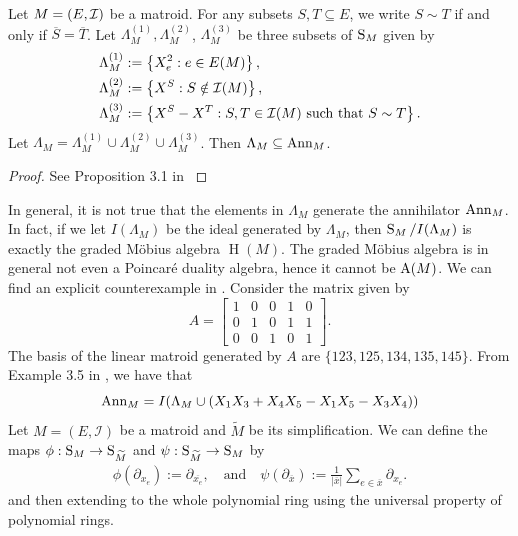 \documentclass{puthesis-UG}
\begin{document}
\begin{prop}
	Let $M = (E, \mathcal{I})$ be a matroid. For any subsets $S, T \subseteq E$, we write $S \sim T$ if and only if $\overline{S} = \overline{T}$. Let $\Lambda_M^{(1)}, \Lambda_M^{(2)}$, $\Lambda_M^{(3)}$ be three subsets of $\operatorname{S}_M$ given by 
	\begin{align*}
		\Lambda_M^{(1)} & := \left \{X_e^2 : e \in E(M) \right \}, \\
		\Lambda_M^{(2)} & := \left \{X^S : S \notin \mathcal{I}(M) \right \}, \\
		\Lambda_M^{(3)} & := \left \{X^S - X^T : S, T \in \mathcal{I}(M) \text{ such that } S \sim T \right \}.
	\end{align*}
	Let $\Lambda_M = \Lambda_M^{(1)} \cup \Lambda_M^{(2)} \cup \Lambda_M^{(3)}$. Then $\Lambda_M \subseteq \operatorname{Ann}_M$. 
\end{prop}

\begin{proof}
	See Proposition 3.1 in \cite{MN-gorenstein}
\end{proof}

In general, it is not true that the elements in $\Lambda_M$ generate the annihilator $\operatorname{Ann}_M$. In fact, if we let $I(\Lambda_M)$ be the ideal generated by $\Lambda_M$, then $\operatorname{S}_M / I(\Lambda_M)$ is exactly the graded M\"obius algebra $\operatorname{H}(M)$. The graded M\"obius algebra is in general not even a Poincar\'e duality algebra, hence it cannot be $\operatorname{A}(M)$. We can find an explicit counterexample in \cite{MN-gorenstein}. Consider the matrix given by 
\[
	A = \begin{bmatrix}
		1 & 0 & 0 & 1 & 0 \\
		0 & 1 & 0 & 1 & 1 \\
		0 & 0 & 1 & 0 & 1
	\end{bmatrix}.
\]
The basis of the linear matroid generated by $A$ are $\{123, 125, 134, 135, 145\}$. From Example 3.5 in \cite{MN-gorenstein}, we have that 
\[
	\operatorname{Ann}_M =  I(\Lambda_M \cup (X_1X_3 + X_4X_5 - X_1X_5 - X_3X_4))
\]
Let $M = (E, \mathcal{I})$ be a matroid and $\widetilde{M}$ be its simplification. We can define the maps $\phi : \operatorname{S}_M \to \operatorname{S}_{\widetilde{M}}$ and $\psi : \operatorname{S}_{\widetilde{M}} \to \operatorname{S}_M$ by 
\begin{align*}
	\phi (\partial_{x_e}) := \partial_{\overline{x_e}}, \quad \text{and} \quad \psi (\partial_{\overline{x}}) := \frac{1}{|\overline{x}|} \sum_{e \in \overline{x}} \partial_{x_e}.
\end{align*}
and then extending to the whole polynomial ring using the universal property of polynomial rings.
\end{document}
